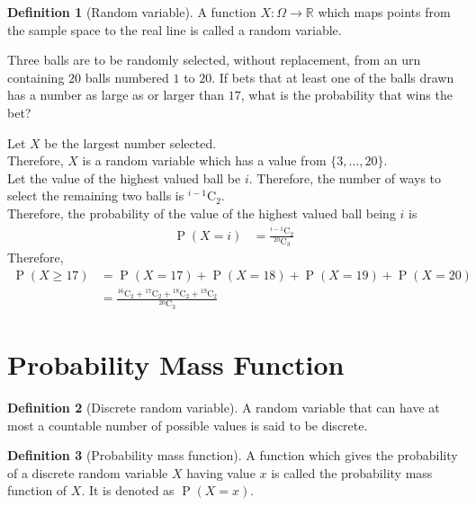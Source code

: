 \documentclass[titlepage, fleqn, a4paper, 12pt, twoside]{article}
\theoremstyle{definition}
\newtheorem{definition}{Definition}
\theoremstyle{theorem}
\DeclareMathOperator{\prob}{\mathrm{P}}
\newcommand*{\comb}[2]{{}^{#1}\mathrm{C}_{#2}}%
\newcommand{\A}{\text{Alice}\xspace}
\begin{document}
\begin{definition}[Random variable]
	A function $X : \Omega \to \mathbb{R}$ which maps points from the sample space to the real line is called a random variable.
\end{definition}

\begin{question}
	Three balls are to be randomly selected, without replacement, from an urn containing $20$ balls numbered $1$ to $20$.
	If \A bets that at least one of the balls drawn has a number as large as or larger than $17$, what is the probability that \A wins the bet?
\end{question}

\begin{solution}
	Let $X$ be the largest number selected.\\
	Therefore, $X$ is a random variable which has a value from $\{3,\dots,20\}$.\\
	Let the value of the highest valued ball be $i$.
	Therefore, the number of ways to select the remaining two balls is $\comb{i - 1}{2}$.\\
	Therefore, the probability of the value of the highest valued ball being $i$ is
	\begin{align*}
		\prob(X = i) & = \frac{\comb{i - 1}{2}}{\comb{20}{3}}
	\end{align*}
	Therefore,
	\begin{align*}
		\prob(X \ge 17) & = \prob(X = 17) + \prob(X = 18) + \prob(X = 19) + \prob(X = 20) \\
                                & = \frac{\comb{16}{2} + \comb{17}{2} + \comb{18}{2} + \comb{19}{2}}{\comb{20}{3}}
	\end{align*}
\end{solution}

\section{Probability Mass Function}

\begin{definition}[Discrete random variable]
	A random variable that can have at most a countable number of possible values is said to be discrete.
\end{definition}

\begin{definition}[Probability mass function]
	A function which gives the probability of a discrete random variable $X$ having value $x$ is called the probability mass function of $X$.
	It is denoted as $\prob(X = x)$.
\end{definition}
\end{document}
